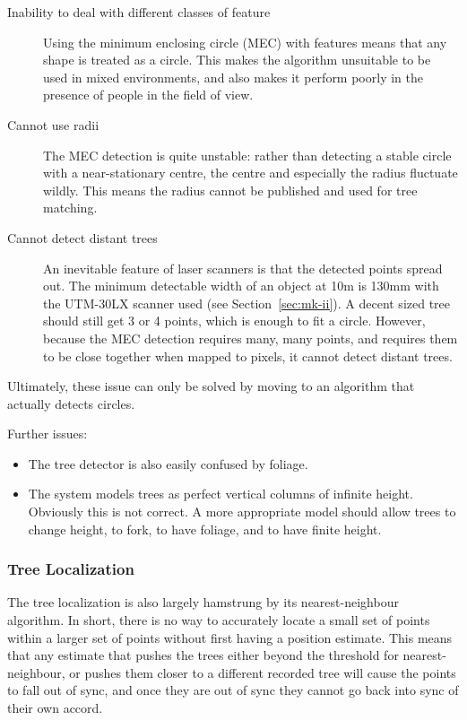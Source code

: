 \documentclass[12pt,oneside,a4paper]{book}
\begin{document}
\begin{description}
\item[Inability to deal with different classes of feature] Using the
  minimum enclosing circle (MEC) with features means that any shape is
  treated as a circle. This makes the algorithm unsuitable to be used
  in mixed environments, and also makes it perform poorly in the
  presence of people in the field of view.
\item[Cannot use radii] The MEC detection is quite unstable: rather
  than detecting a stable circle with a near-stationary centre, the
  centre and especially the radius fluctuate wildly. This means the
  radius cannot be published and used for tree matching.
\item[Cannot detect distant trees] An inevitable feature of laser
  scanners is that the detected points spread out. The minimum
  detectable width of an object at 10m is 130mm with the UTM-30LX
  scanner used (see Section~\ref{sec:mk-ii}). A decent sized tree
  should still get 3 or 4 points, which is enough to fit a
  circle. However, because the MEC detection requires many, many
  points, and requires them to be close together when mapped to
  pixels, it cannot detect distant trees.
\end{description}

Ultimately, these issue can only be solved by moving to an algorithm
that actually detects circles.

Further issues:
\begin{itemize}
\item The tree detector is also easily confused by foliage.
\item The system models trees as perfect vertical columns of infinite
  height. Obviously this is not correct. A more appropriate model
  should allow trees to change height, to fork, to have foliage, and
  to have finite height.
\end{itemize}

\subsubsection{Tree Localization}
\label{sec:tree-localization}

The tree localization is also largely hamstrung by its
nearest-neighbour algorithm. In short, there is no way to accurately
locate a small set of points within a larger set of points without
first having a position estimate. This means that any estimate that
pushes the trees either beyond the threshold for nearest-neighbour, or
pushes them closer to a different recorded tree will cause the points
to fall out of sync, and once they are out of sync they cannot go back
into sync of their own accord.
\end{document}

